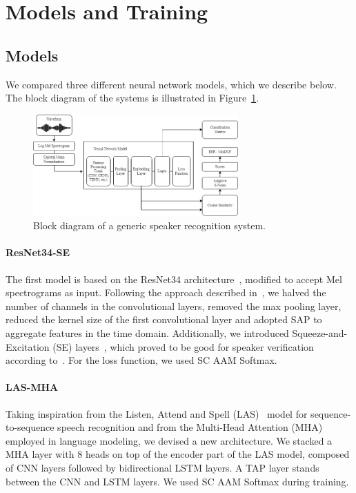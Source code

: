 \documentclass[conference]{IEEEtran}
\begin{document}
\section{Models and Training}

\subsection{Models}

We compared three different neural network models, which we describe below. The block diagram of the systems is illustrated in Figure~\ref{fig:block_diagram}.

\begin{figure}[htbp]
    \centerline{\includegraphics[width=0.7\textwidth]{img/apr_block_diagram.png}}
    \caption{Block diagram of a generic speaker recognition system.}
    \label{fig:block_diagram}
\end{figure}

\paragraph{ResNet34-SE}

The first model is based on the ResNet34 architecture~\cite{he2016resnet}, modified to accept Mel spectrograms as input. Following the approach described in~\cite{heo2020clova,chung2020defence}, we halved the number of channels in the convolutional layers, removed the max pooling layer, reduced the kernel size of the first convolutional layer and adopted SAP to aggregate features in the time domain. Additionally, we introduced Squeeze-and-Excitation (SE) layers~\cite{jie2020squeeze}, which proved to be good for speaker verification according to~\cite{zhang2021beijing}. For the loss function, we used SC AAM Softmax.

\paragraph{LAS-MHA}

Taking inspiration from the Listen, Attend and Spell (LAS)~\cite{irie2019las} model for sequence-to-sequence speech recognition and from the Multi-Head Attention (MHA)~\cite{vaswani2017attention} employed in language modeling, we devised a new architecture. We stacked a MHA layer with 8 heads on top of the encoder part of the LAS model, composed of CNN layers followed by bidirectional LSTM layers. A TAP layer stands between the CNN and LSTM layers. We used SC AAM Softmax during training.
\end{document}
